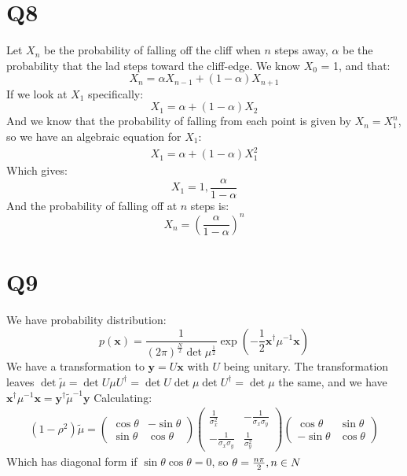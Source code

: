 \documentclass[../main.tex]{subfiles}
\begin{document}
\section*{Q8}
Let $X_n$ be the probability of falling off the cliff when $n$ steps away, $\alpha$ be the probability that the lad steps toward the cliff-edge. We know $X_0$ = 1, and that:
\begin{equation}
	X_n=\alpha X_{n-1} + (1-\alpha) X_{n+1}
\end{equation}
If we look at $X_1$ specifically:
\begin{equation}
		X_1=\alpha+(1-\alpha)X_2
\end{equation}
And we know that the probability of falling from each point is given by $X_n=X_1^{n}$, so we have an algebraic equation for $X_1$:
\begin{align}
	X_1=\alpha+(1-\alpha)X_1^2
\end{align}
Which gives:
\begin{equation}
	X_1=1,\frac{\alpha}{1-\alpha}
\end{equation}
And the probability of falling off at $n$ steps is:
\begin{equation}
	X_n = \left(\frac{\alpha}{1-\alpha}\right)^n
\end{equation}
\section*{Q9}
We have probability distribution:
\begin{equation}
	p(\mathbf{x}) = \frac{1}{(2\pi)^{\frac{N}{2}}\det{\mu}^{\frac{1}{2}}}\exp{\left(-\frac{1}{2}\mathbf{x}^\dag\mu^{-1}\mathbf{x}\right)}
\end{equation}
We have a transformation to $\mathbf{y}=U\mathbf{x}$ with $U$ being unitary. The transformation leaves $\det{\tilde\mu}=\det{U\mu U^\dag}=\det{U}\det{\mu}\det{U^\dag}=\det{\mu}$ the same, and we have $\mathbf{x^\dag}\mu^{-1}\mathbf{x}=\mathbf{y^\dag}\tilde\mu^{-1}\mathbf{y}$
Calculating:
\begin{align}
(1-\rho^2)\tilde\mu = \left(\begin{matrix}\cos\theta & -\sin\theta \\ \sin\theta & \cos\theta\end{matrix}\right) 
\left(\begin{matrix}\frac{1}{\sigma_x^2} & -\frac{1}{\sigma_x\sigma_y} \\ - \frac{1}{\sigma_x\sigma_y} & \frac{1}{\sigma_y^2}\end{matrix} \right)
\left( \begin{matrix}\cos\theta & \sin\theta \\ -\sin\theta & \cos\theta\end{matrix}\right)
\end{align}
Which has diagonal form if $\sin\theta\cos\theta=0$, so $\theta=\frac{n\pi}{2}, n\in\mathcal \mathbb{N}$
\end{document}
